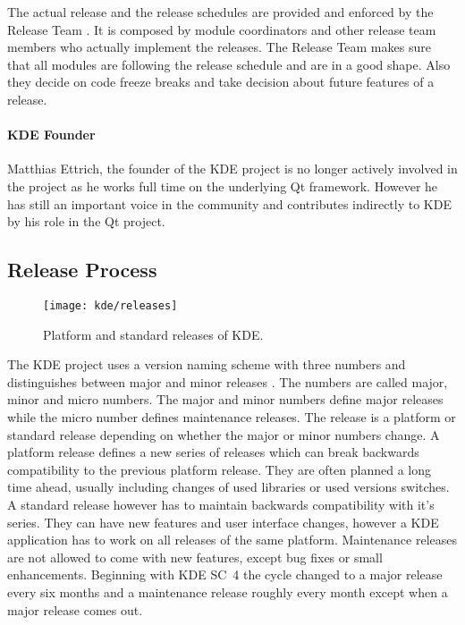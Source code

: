 The actual release and the release schedules are provided and enforced by the
Release Team \cite{KDEReleaseTeam}. It is composed by module coordinators and
other release team members who actually implement the releases. The Release
Team makes sure that all modules are following the release schedule and are in
a good shape. Also they decide on code freeze breaks and take decision about
future features of a release.

\paragraph{KDE Founder}

Matthias Ettrich, the founder of the KDE project is no longer actively involved
in the project as he works full time on the underlying Qt framework. However he
has still an important voice in the community and contributes indirectly to KDE
by his role in the Qt project.


\subsection{Release Process} %

\begin{figure}[htbp]
  \centering
  \texttt{[image: kde/releases]}
  \caption{Platform and standard releases of KDE.}
\end{figure}

The KDE project uses a version naming scheme with three numbers and
distinguishes between major and minor releases
\cite{KDEReleaseTeam,KDEReleaseSchedule,KDESchedule}. The numbers are called
major, minor and micro numbers. The major and minor numbers define major
releases while the micro number defines maintenance releases. The release is a
platform or standard release depending on whether the major or minor numbers
change. A platform release defines a new series of releases which can break
backwards compatibility to the previous platform release. They are often
planned a long time ahead, usually including changes of used libraries or used
versions switches. A standard release however has to maintain backwards
compatibility with it's series. They can have new features and user interface
changes, however a KDE application has to work on all releases of the same
platform. Maintenance releases are not allowed to come with new features,
except bug fixes or small enhancements. Beginning with \ac{KDE SC}~4 the cycle
changed to a major release every six months and a maintenance release roughly
every month except when a major release comes out.

